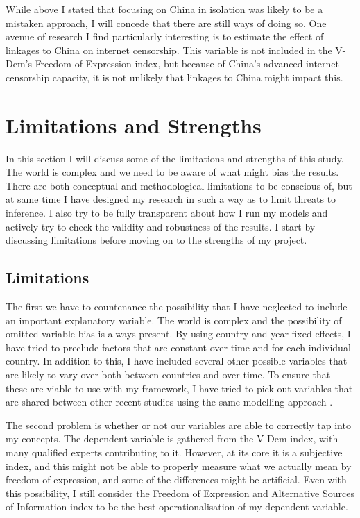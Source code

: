 While above I stated that focusing on China in isolation was likely to be a mistaken approach, I will concede that there are still ways of doing so. One avenue of research I find particularly interesting is to estimate the effect of linkages to China on internet censorship. This variable is not included in the V-Dem's Freedom of Expression index, but because of China's advanced internet censorship capacity, it is not unlikely that linkages to China might impact this.

\section{Limitations and Strengths}
In this section I will discuss some of the limitations and strengths of this study. The world is complex and we need to be aware of what might bias the results. There are both conceptual and methodological limitations to be conscious of, but at same time I have designed my research in such a way as to limit threats to inference. I also try to be fully transparent about how I run my models and actively try to check the validity and robustness of the results.  I start by discussing limitations before moving on to the strengths of my project.

\subsection{Limitations}
The first we have to countenance the possibility that I have neglected to include an important explanatory variable. The world is complex and the possibility of omitted variable bias is always present. By using country and year fixed-effects, I have tried to preclude factors that are constant over time and for each individual country. In addition to this, I have included several other possible variables that are likely to vary over both between countries and over time. To ensure that these are viable to use with my framework, I have tried to pick out variables that are shared between other recent studies using the same modelling approach \citep{gamso_is_2021, toettoe_foreign_2023}.

The second problem is whether or not our variables are able to correctly tap into my concepts. The dependent variable is gathered from the V-Dem index, with many qualified experts contributing to it. However, at its core it is a subjective index, and this might not be able to properly measure what we actually mean by freedom of expression, and some of the differences might be artificial. Even with this possibility, I still consider the Freedom of Expression and Alternative Sources of Information index to be the best operationalisation of my dependent variable.

